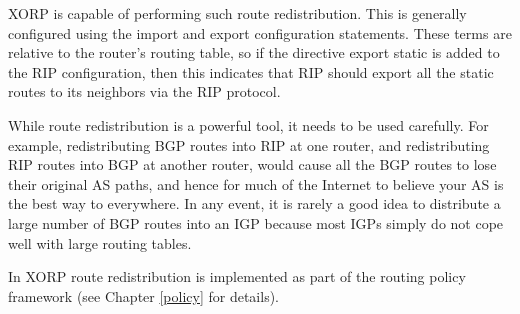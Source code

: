 XORP is capable of performing such route redistribution.  This is
generally configured using the {\stt import} and {\stt export}
configuration statements.  These terms are relative to the router's
routing table, so if the directive {\stt export static} is added to the
RIP configuration, then this indicates that RIP should export all the
static routes to its neighbors via the RIP protocol.

While route redistribution is a powerful tool, it needs to be used
carefully.  For example, redistributing BGP routes into RIP at one
router, and redistributing RIP routes into BGP at another router,
would cause all the BGP routes to lose their original AS paths, and
hence for much of the Internet to believe your AS is the best way to
everywhere.  In any event, it is rarely a good idea to distribute a
large number of BGP routes into an IGP because most IGPs simply do not
cope well with large routing tables.

In XORP route redistribution is implemented as part of the routing
policy framework (see Chapter \ref{policy} for details).
